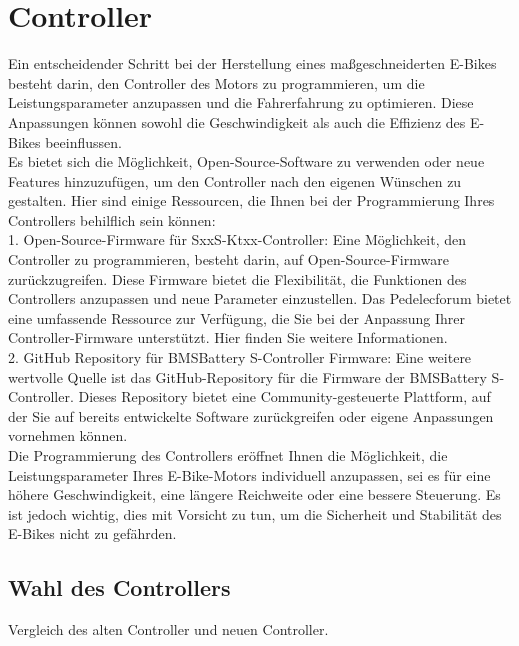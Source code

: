 
\chapter{Controller}
Ein entscheidender Schritt bei der Herstellung eines maßgeschneiderten E-Bikes besteht darin, den Controller des Motors zu programmieren, um die Leistungsparameter anzupassen und die Fahrerfahrung zu optimieren. Diese Anpassungen können sowohl die Geschwindigkeit als auch die Effizienz des E-Bikes beeinflussen.\\

Es bietet sich die Möglichkeit, Open-Source-Software zu verwenden oder neue Features hinzuzufügen, um den Controller nach den eigenen Wünschen zu gestalten. Hier sind einige Ressourcen, die Ihnen bei der Programmierung Ihres Controllers behilflich sein können:\\

    1. Open-Source-Firmware für SxxS-Ktxx-Controller: Eine Möglichkeit, den Controller zu programmieren, besteht darin, auf Open-Source-Firmware zurückzugreifen. Diese Firmware bietet die Flexibilität, die Funktionen des Controllers anzupassen und neue Parameter einzustellen. Das Pedelecforum bietet eine umfassende Ressource zur Verfügung, die Sie bei der Anpassung Ihrer Controller-Firmware unterstützt. Hier finden Sie weitere Informationen.\\

    2. GitHub Repository für BMSBattery S-Controller Firmware: Eine weitere wertvolle Quelle ist das GitHub-Repository für die Firmware der BMSBattery S-Controller. Dieses Repository bietet eine Community-gesteuerte Plattform, auf der Sie auf bereits entwickelte Software zurückgreifen oder eigene Anpassungen vornehmen können.\\

Die Programmierung des Controllers eröffnet Ihnen die Möglichkeit, die Leistungsparameter Ihres E-Bike-Motors individuell anzupassen, sei es für eine höhere Geschwindigkeit, eine längere Reichweite oder eine bessere Steuerung. Es ist jedoch wichtig, dies mit Vorsicht zu tun, um die Sicherheit und Stabilität des E-Bikes nicht zu gefährden.\\

\section{Wahl des Controllers}
Vergleich des alten Controller und neuen Controller.

